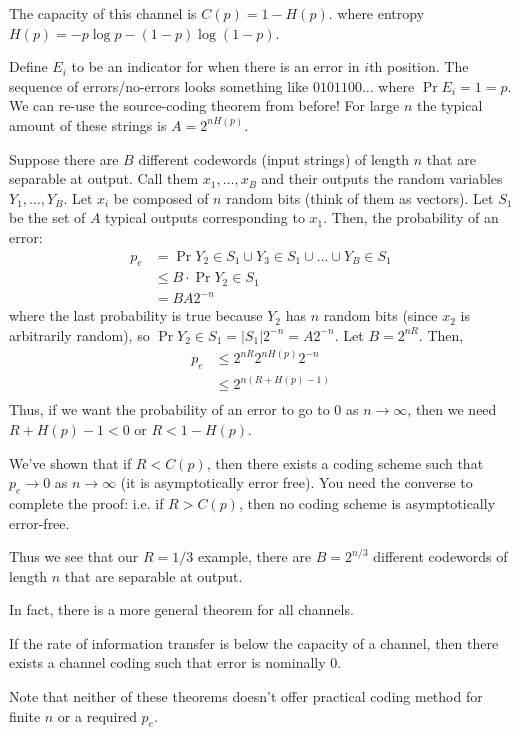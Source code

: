 \begin{theorem}
    The capacity of this channel is $C(p) = 1 - H(p)$. where entropy $H(p) = -p \log p - (1 - p) \log (1- p)$.

    \begin{proof*}
        Define $E_i$ to be an indicator for when there is an error in $i$th position.
        The sequence of errors/no-errors looks something like $0101100\dots$ where $\Pr{E_i = 1} = p$.
        We can re-use the source-coding theorem from before! For large $n$ the typical amount of these strings is
        $A = 2^{nH(p)}$.

        Suppose there are $B$ different codewords (input strings) of length $n$ that are separable at output. Call them
        $x_1, \dots, x_B$ and their outputs the random variables $Y_1, \dots, Y_B$. Let $x_i$ be composed of $n$ random bits (think of them as vectors).
        Let $S_1$ be the set of $A$ typical outputs corresponding to $x_1$. Then, the probability of an error:
        \begin{align*}
            p_e &= \Pr{Y_2 \in S_1 \cup Y_3 \in S_1 \cup \dots \cup Y_B \in S_1} \\
            &\leq B \cdot \Pr{Y_2 \in S_1} \\
            &= B A 2^{-n}
        \end{align*}
        where the last probability is true because $Y_2$ has $n$ random bits (since $x_2$ is arbitrarily random), so $\Pr{Y_2 \in S_1} = |S_1| 2^{-n} = A2^{-n}$.
        Let $B = 2^{nR}$. Then,
        \begin{align*}
            p_e &\leq 2^{nR} 2^{nH(p)} 2^{-n}\\
            &\leq 2^{n(R + H(p) - 1)}\\
        \end{align*}
        Thus, if we want the probability of an error to go to 0 as $n \to \infty$, then we need $R + H(p) - 1 < 0$ or $R < 1 - H(p)$.

        We've shown that if $R < C(p)$, then there exists a coding scheme such that $p_e \to 0$ as $n \to \infty$ (it is asymptotically error free).
        You need the converse to complete the proof: i.e. if $R > C(p)$, then
        no coding scheme is asymptotically error-free.
    \end{proof*}
\end{theorem}

Thus we see that our $R = 1/3$ example, there are $B = 2^{n/3}$ different codewords of length $n$ that are separable at output.

In fact, there is a more general theorem for all channels.
\begin{theorem}
    If the rate of information transfer is below the capacity of a channel, then there exists a channel coding such that error is nominally 0.
\end{theorem}

Note that neither of these theorems doesn't offer practical coding method for finite $n$ or a required $p_e$.
